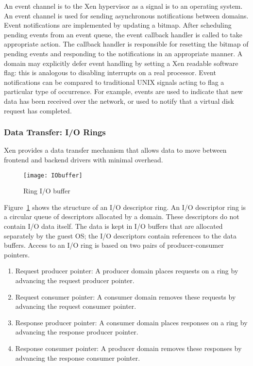 An event channel is to the Xen hypervisor as a signal is to an operating
system. An event channel is used for sending asynchronous notifications
between domains. Event notifications are implemented by updating a
bitmap. After scheduling pending events from an event queue, the event
callback handler is called to take appropriate action. The callback
handler is responsible for resetting the bitmap of pending events and
responding to the notifications in an appropriate manner. A domain may
explicitly defer event handling by setting a Xen readable software flag:
this is analogous to disabling interrupts on a real processor. Event
notifications can be compared to traditional UNIX signals acting to
flag a particular type of occurrence. For example, events are used to
indicate that new data has been received over the network, or used to
notify that a virtual disk request has completed.

\subsubsection*{Data Transfer: I/O Rings}
\label{subsec:io rings}
Xen provides a data transfer mechanism that allows data to move
between frontend and backend drivers with minimal overhead.

\begin{figure}[!ht]
\centering
\texttt{[image: IObuffer]}
\caption{Ring I/O buffer}
\label{fig:Ring buffer}
\end{figure}

Figure~\ref{fig:Ring buffer} shows the structure of an I/O descriptor
ring. An I/O descriptor ring is a circular queue of descriptors allocated
by a domain. These descriptors do not contain I/O data itself. The data is kept in I/O buffers
that are allocated separately by the guest OS; the I/O descriptors contain 
references to the data buffers.  Access to an I/O ring is based on two pairs
of producer-consumer pointers.

\begin{enumerate}
\item Request producer pointer: A producer domain places requests on a
ring by advancing the request producer pointer.

\item Request consumer pointer: A consumer domain removes these requests
by advancing the request consumer pointer.

\item Response producer pointer: A consumer domain places responses on
a ring by advancing the response producer pointer.

\item Response consumer pointer: A producer domain removes these responses
by advancing the response consumer pointer.

\end{enumerate} 

